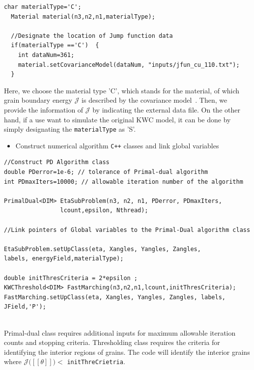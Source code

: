 \documentclass[11pt]{article}
\begin{document}
\begin{tcolorbox}
\begin{lstlisting}[basicstyle=\footnotesize]
  char materialType='C';
  Material material(n3,n2,n1,materialType);

  //Designate the location of Jump function data
  if(materialType =='C')  {
    int dataNum=361;
    material.setCovarianceModel(dataNum, "inputs/jfun_cu_110.txt");
  }
\end{lstlisting}
\end{tcolorbox}
Here, we choose the material type 'C', which stands for the material,
of which grain boundary energy $\mathcal{J}$ is described by the 
covariance model~\cite{Runnels:2016_1,Runnels:2016_2}.
Then, we provide the information of $\mathcal{J}$ by
indicating the external data file.
On the other hand, if a use want to simulate the original KWC model, 
it can be done by simply designating the \texttt{materialType} as 'S'.

\begin{itemize} \item Construct numerical algorithm \texttt{C++} classes
and link global variables \end{itemize}

\begin{tcolorbox}
\begin{lstlisting}[basicstyle=\footnotesize]
//Construct PD Algorithm class
double PDerror=1e-6; // tolerance of Primal-dual algorithm
int PDmaxIters=10000; // allowable iteration number of the algorithm

PrimalDual<DIM> EtaSubProblem(n3, n2, n1, PDerror, PDmaxIters,
				lcount,epsilon, Nthread);
  
//Link pointers of Global variables to the Primal-Dual algorithm class

EtaSubProblem.setUpClass(eta, Xangles, Yangles, Zangles,
labels, energyField,materialType);

double initThresCriteria = 2*epsilon ;
KWCThreshold<DIM> FastMarching(n3,n2,n1,lcount,initThresCriteria);
FastMarching.setUpClass(eta, Xangles, Yangles, Zangles, labels, JField,'P');
    
\end{lstlisting}
\end{tcolorbox}

Primal-dual class requires additional inputs for maximum allowable 
iteration counts and stopping criteria. 
Thresholding class requires the criteria for identifying the interior regions
of grains. The code will identify the interior grains where 
$\mathcal{J}\big( [\![ \theta]\!]\big) <$ \texttt{initThreCrietria}.
\end{document}
